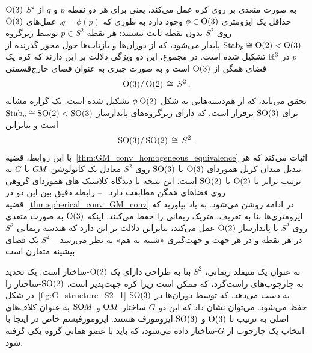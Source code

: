 $\operatorname{O}(3)$ به صورت متعدی بر روی کره عمل می‌کند، یعنی برای هر دو نقطه $p$ و $q$ از $S^2$ حداقل یک ایزومتری $\phi\in\operatorname{O}(3)$ وجود دارد به طوری که $q = \phi(p)$.
عمل‌های $\operatorname{O}(3)$ روی $S^2$ بدون نقطه ثابت نیستند:
هر نقطه $p\in S^2$ توسط زیرگروه $\operatorname{Stab}_{p} \cong \operatorname{O}(2) < \operatorname{O}(3)$ پایدار می‌شود، که از دوران‌ها و بازتاب‌ها حول محور گذرنده از $p$ در $\mathbb{R}^3$ تشکیل شده است.
در مجموع، این دو ویژگی دلالت بر این دارند که کره یک فضای همگن از $\operatorname{O}(3)$ است و به صورت جبری به عنوان فضای خارج‌قسمتی
\begin{align}
    \operatorname{O}(3)/\operatorname{O}(2) \,\cong\, S^2 \,,
\end{align}
تحقق می‌یابد، که از هم‌دسته‌هایی به شکل ${\phi\mkern1mu.\mkern-4mu\operatorname{O}(2)}$ تشکیل شده است.
یک گزاره مشابه برای $\operatorname{SO}(3)$ برقرار است، که دارای زیرگروه‌های پایدارساز $\operatorname{Stab}_{p} \cong \operatorname{SO}(2) < \operatorname{SO}(3)$ است و بنابراین
\begin{align}
    \operatorname{SO}(3)/\operatorname{SO}(2) \,\cong\, S^2 \,.
\end{align}
با این روابط، قضیه~\ref{thm:GM_conv_homogeneous_equivalence} اثبات می‌کند که هر تبدیل میدان کرنل هموردای $\operatorname{O}(3)$ یا $\operatorname{SO}(3)$ روی $S^2$ معادل یک کانولوشن $G\mkern-1.4muM$ با $G$ به ترتیب برابر با $\operatorname{O}(2)$ یا $\operatorname{SO}(2)$ است.
این نتیجه با دیدگاه کلاسیک های هموردای گروهی روی فضاهای همگن مطابقت دارد~\cite{Cohen2019-generaltheory} -- رابطه دقیق بین این دو در قضیه~\ref{thm:spherical_conv_GM_conv} در ادامه روشن می‌شود.
به یاد بیاورید که ایزومتری‌ها بنا به تعریف، متریک ریمانی را حفظ می‌کنند.
اینکه $\operatorname{O}(3)$ به صورت متعدی روی $S^2$ با پایدارساز $\operatorname{O}(2)$ عمل می‌کند، بنابراین دلالت بر این دارد که هندسه ریمانی $S^2$ در هر نقطه و در هر جهت و جهت‌گیری «شبیه به هم» به نظر می‌رسد -- $S^2$ یک فضای بیشینه متقارن است.


به عنوان یک منیفلد ریمانی، $S^2$ بنا به طراحی دارای یک $\operatorname{O}(2)$-ساختار است.
یک تحدید به چارچوب‌های راست‌گرد، که ممکن است زیرا کره جهت‌پذیر است، $\operatorname{SO}(2)$-ساختار را در شکل~\ref{fig:G_structure_S2_1} به دست می‌دهد، که توسط دوران‌ها در $\operatorname{SO}(3)$ حفظ می‌شود.
می‌توان نشان داد که این دو $G$-ساختار $\operatorname{O}\mkern-3.6muM$ و $\operatorname{SO}\mkern-3.6muM$ به عنوان کلاف‌های اصلی به ترتیب با $\operatorname{O}(3)$ و $\operatorname{SO}(3)$ ایزومورف هستند.
ایزومورفیسم خاص در اینجا با انتخاب یک چارچوب از $G$-ساختار داده می‌شود، که باید با عضو همانی گروه یکی گرفته شود.

